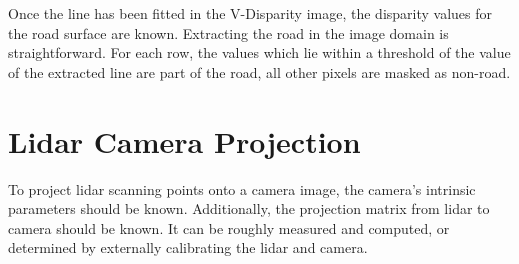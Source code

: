Once the line has been fitted in the V-Disparity image, the disparity values for the road surface are known. Extracting the road in the image domain is straightforward. For each row, the values which lie within a threshold of the value of the extracted line are part of the road, all other pixels are masked as non-road.




\section{Lidar Camera Projection}

To project lidar scanning points onto a camera image, the camera's intrinsic parameters should be known. Additionally, the projection matrix from lidar to camera should be known. It can be roughly measured and computed, or determined by externally calibrating the lidar and camera.\newline

